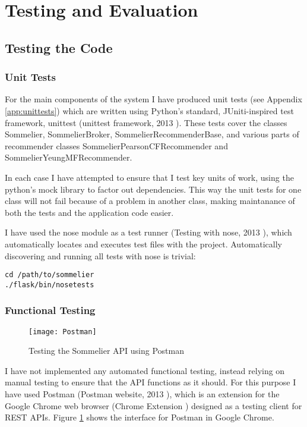 \section{Testing and Evaluation}\label{testing}

\subsection{Testing the Code}

\subsubsection{Unit Tests}

For the main components of the system I have produced unit tests (see Appendix \ref{app:unittests}) which are written using Python's standard, JUniti-inspired test framework, unittest (unittest framework, 2013 \cite{PythonUnittest}). These tests cover the classes Sommelier, SommelierBroker, SommelierRecommenderBase, and various parts of recommender classes SommelierPearsonCFRecommender and SommelierYeungMFRecommender.

In each case I have attempted to ensure that I test key units of work, using the python's mock library to factor out dependencies. This way the unit tests for one class will not fail because of a problem in another class, making maintanance of both the tests and the application code easier.

I have used the nose module as a test runner (Testing with nose, 2013 \cite{ReadthedocsNose}), which automatically locates and executes test files with the project. Automatically discovering and running all tests with nose is trivial:

\footnotesize
\begin{verbatim}
cd /path/to/sommelier
./flask/bin/nosetests
\end{verbatim}
\normalsize

\subsubsection{Functional Testing}

\begin{figure}[h!]
    \caption{Testing the Sommelier API using Postman}
    \centering
        \texttt{[image: Postman]}
    \label{fig:postman}
\end{figure}

I have not implemented any automated functional testing, instead relying on manual testing to ensure that the API functions as it should. For this purpose I have used Postman (Postman website, 2013 \cite{Postman}), which is an extension for the Google Chrome web browser (Chrome Extension \cite{ChromePostman}) designed as a testing client for REST APIs. Figure \ref{fig:postman} shows the interface for Postman in Google Chrome.

